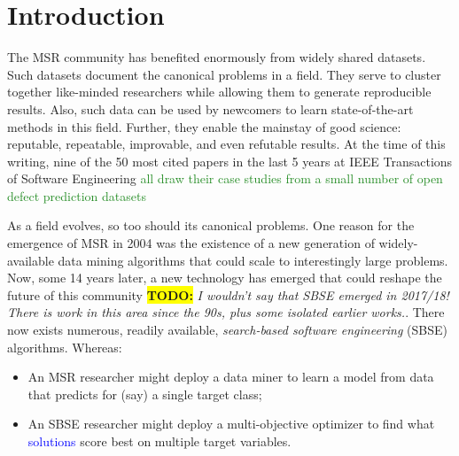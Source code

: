 \documentclass[sigconf,anonymous,review]{acmart}
\newcommand\TODO[1]{\textcolor{ScarletRed}{\textbf{\colorbox{yellow}{\small TODO:}} \emph{#1}}\xspace}
\newcommand\llm[1]{\textcolor{blue}{#1\xspace}}
\newcommand\vivek[1]{\textcolor{ForestGreen}{#1\xspace}}
\begin{document}


\keywords{}


\maketitle
\pagestyle{plain}
% 





\section{Introduction}


The MSR  community has benefited enormously from widely shared datasets.  Such datasets document the canonical problems in a field.
They serve to cluster together like-minded researchers while  
  allowing   them to generate reproducible results. Also, such data can be used by
   newcomers to learn state-of-the-art methods in this field. Further, they enable the mainstay of good science:
reputable, repeatable,  improvable, and even refutable results.
At the time of this writing,   nine of the 50 most cited papers in the last 5 years at IEEE Transactions of Software Engineering \vivek{all draw their case studies
from a small number of open defect prediction datasets} 


As a field evolves, so too should its canonical problems. One  reason for the emergence of   MSR  in 2004 was the existence of a new generation of widely-available data mining
algorithms that could scale to interestingly large problems.  Now, some 14 years later, a new technology has emerged that could reshape the future of this community \TODO{I wouldn't say that SBSE emerged in 2017/18! There is work in this area since the 90s, plus some isolated earlier works.}. There now exists numerous, readily
available, {\em search-based software engineering} (SBSE) algorithms. Whereas:
\begin{itemize}
\item
An MSR researcher might deploy a
data miner to learn a model from  data   that predicts for (say) a single target class;
\item
An SBSE researcher might deploy a multi-objective optimizer
to find what \llm{solutions} score best
on multiple target variables.
\end{itemize}
\end{document}
